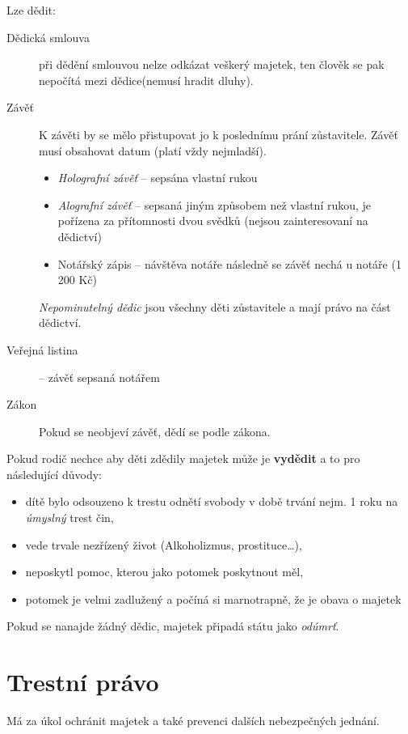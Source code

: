 \documentclass[10pt,a4paper,
twoside,%
]{report}
\begin{document}
Lze dědit:
\begin{description}
\item[Dědická smlouva] při dědění smlouvou nelze odkázat veškerý majetek, ten člověk se pak nepočítá mezi dědice(nemusí hradit dluhy).
\item[Závěť]  K závěti by se mělo přistupovat jo k poslednímu prání zůstavitele. Závěť musí obsahovat datum (platí vždy nejmladší). \begin{itemize}
	\item \emph{Holografní závěť} -- sepsána vlastní rukou
	\item \emph{Alografní závěť} -- sepsaná jiným způsobem než vlastní rukou, je pořízena za přítomnosti dvou svědků (nejsou zainteresovaní na dědictví)
	\item Notářský zápis -- návštěva notáře následně se závěť nechá u notáře (1\,200 Kč)
	\end{itemize}
	
	\emph{Nepominutelný dědic} jsou všechny děti zůstavitele a mají právo na část dědictví.
	
\item[Veřejná listina] -- závěť sepsaná notářem

\item[Zákon] Pokud se neobjeví závěť, dědí se podle zákona.

\end{description} 

Pokud rodič nechce aby děti zdědily majetek může je \textbf{vydědit} a to pro následující důvody: \begin{itemize}
\item dítě bylo odsouzeno k trestu odnětí svobody v době trvání nejm. 1 roku na \emph{úmyslný} trest čin,
\item vede trvale nezřízený život (Alkoholizmus, prostituce\dots),
\item neposkytl pomoc, kterou jako potomek poskytnout měl,
\item potomek je velmi zadlužený a počíná si marnotrapně, že je obava o majetek
\end{itemize}

Pokud se nanajde žádný dědic, majetek připadá státu jako \emph{odúmrť}.

\chapter{Trestní právo}
Má za úkol ochránit majetek a také prevenci dalších nebezpečných jednání.
\end{document}
